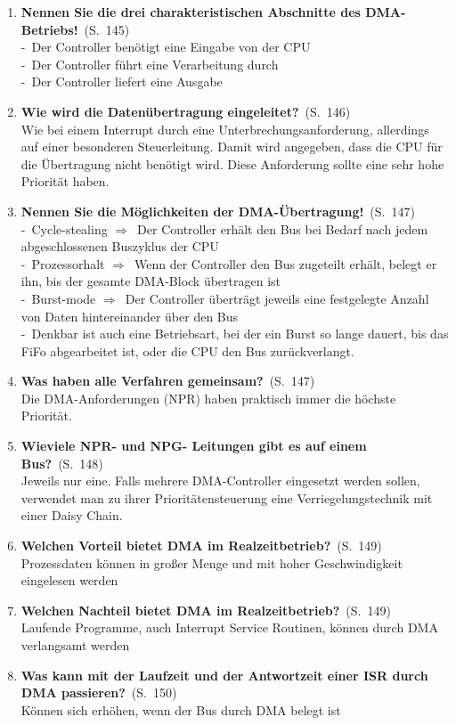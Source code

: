 \documentclass[a4paper,12pt]{article}
\newcommand{\question}[3]{\pagebreak[3]\item {\textbf{#1?}}\ (S.\ #2)#3}
\newcommand{\statement}[3]{\pagebreak[3]\item {\textbf{#1!}}\ (S.\ #2)#3}
\newcommand{\catchword}[1]{\\-\ #1}
\newcommand{\normaltext}[1]{\\#1}
\newcommand{\resultol}[1]{$\Rightarrow$\ #1}
\newcommand{\page}[1]{#1}
\begin{document}
\begin{enumerate}
  \statement{Nennen Sie die drei charakteristischen Abschnitte des DMA-Betriebs}{\page{145}}
  {
    \catchword{Der Controller benötigt eine Eingabe von der CPU}
    \catchword{Der Controller führt eine Verarbeitung durch}
    \catchword{Der Controller liefert eine Ausgabe}
  }

  \question{Wie wird die Datenübertragung eingeleitet}{\page{146}}
  {
    \normaltext{Wie bei einem Interrupt durch eine Unterbrechungsanforderung, allerdings
                auf einer besonderen Steuerleitung. Damit wird angegeben, dass die CPU
                für die Übertragung nicht benötigt wird. Diese Anforderung sollte eine
                sehr hohe Priorität haben.}
  }

  \statement{Nennen Sie die Möglichkeiten der DMA-Übertragung}{\page{147}}
  {
    \catchword{Cycle-stealing \resultol{Der Controller erhält den Bus bei Bedarf nach jedem abgeschlossenen
               Buszyklus der CPU}}
    \catchword{Prozessorhalt \resultol{Wenn der Controller den Bus zugeteilt erhält, belegt er ihn, bis der
               gesamte DMA-Block übertragen ist}}
    \catchword{Burst-mode \resultol{Der Controller überträgt jeweils eine festgelegte Anzahl von Daten
               hintereinander über den Bus}}
    \catchword{Denkbar ist auch eine Betriebsart, bei der ein Burst so lange dauert, bis das FiFo abgearbeitet
               ist, oder die CPU den Bus zurückverlangt.}
  }

  \question{Was haben alle Verfahren gemeinsam}{\page{147}}
  {
    \normaltext{Die DMA-Anforderungen (NPR) haben praktisch immer die höchste Priorität.}
  }

  \question{Wieviele NPR- und NPG- Leitungen gibt es auf einem Bus}{\page{148}}
  {
    \normaltext{Jeweils nur eine. Falls mehrere DMA-Controller eingesetzt werden sollen, verwendet 
                man zu ihrer Prioritätensteuerung eine Verriegelungstechnik mit einer Daisy Chain.}
  }

  \question{Welchen Vorteil bietet DMA im Realzeitbetrieb}{\page{149}}
  {
    \normaltext{Prozessdaten können in großer Menge und mit hoher Geschwindigkeit eingelesen werden}
  }

  \question{Welchen Nachteil bietet DMA im Realzeitbetrieb}{\page{149}}
  {
    \normaltext{Laufende Programme, auch Interrupt Service Routinen, können durch
                DMA verlangsamt werden}
  }

  \question{Was kann mit der Laufzeit und der Antwortzeit einer ISR durch DMA passieren}{\page{150}}
  {
    \normaltext{Können sich erhöhen, wenn der Bus durch DMA belegt ist}
  }


\end{enumerate}
\end{document}
